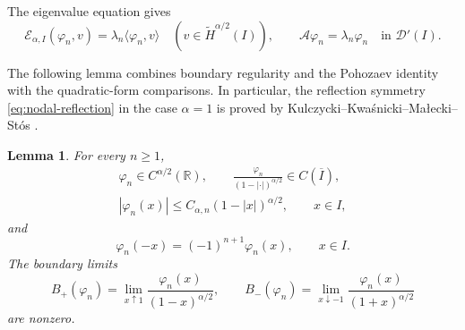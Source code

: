 \documentclass[11pt]{amsart}
\numberwithin{equation}{section}
\newtheorem{lemma}[lemma]{Lemma}
\theoremstyle{remark}
\newcommand{\R}{\mathbb R}
\newcommand{\wt}{\widetilde}
\newcommand{\ip}[2]{\langle #1,#2\rangle}
\newcommand{\calE}{\mathcal E}
\begin{document}
The eigenvalue equation gives
\begin{equation}\label{eq:nodal-weak}
 \calE_{\alpha,I}(\varphi_n,v)=\lambda_n\ip{\varphi_n}{v}
 \quad(v\in\wt H^{\alpha/2}(I)),
 \qquad
 \mathcal A\varphi_n=\lambda_n\varphi_n\quad\text{in }\mathcal D'(I).
\end{equation}

The following lemma combines boundary regularity and the Pohozaev identity
with the quadratic-form comparisons. In particular, the reflection symmetry \eqref{eq:nodal-reflection} in the case $\alpha=1$ is proved by Kulczycki–Kwaśnicki–Małecki–Stós \cite[Corollary~3]{KulczyckiKwasnickiMaleckiStos}. 

\begin{lemma}\label{lem:nodal-boundary}\label{lem:nodal-continuity}
For every $n\ge1$,
\begin{equation}\label{eq:nodal-boundary-reg}
 \begin{gathered}
 \varphi_n\in C^{\alpha/2}(\R),\qquad
 \frac{\varphi_n}{(1-|\cdot|)^{\alpha/2}}\in C(\overline I),\\
 |\varphi_n(x)|\le C_{\alpha,n}(1-|x|)^{\alpha/2},\qquad x\in I,
 \end{gathered}
\end{equation}
and
\begin{equation}\label{eq:nodal-reflection}
 \varphi_n(-x)=(-1)^{n+1}\varphi_n(x),\qquad x\in I.
\end{equation}
The boundary limits
\[
 B_+(\varphi_n)=\lim_{x\uparrow1}
       \frac{\varphi_n(x)}{(1-x)^{\alpha/2}},\qquad
 B_-(\varphi_n)=\lim_{x\downarrow-1}
       \frac{\varphi_n(x)}{(1+x)^{\alpha/2}}
\]
are nonzero.
\end{lemma}
\end{document}
